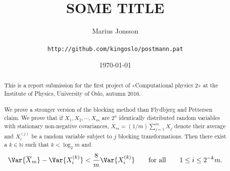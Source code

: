 \documentclass[11pt,english,a4paper]{article}
\author{\normalsize Marius Jonsson \\\\
\vspace{5px}
\normalsize \texttt{http://github.com/kingoslo/postmann.pat}}
\title{\bf \uppercase{Some title}}
\date{\normalsize \today}
\begin{document}
\maketitle
\begin{abstract} \normalsize This is a report submission for the first project of «Computational physics 2» at the Institute of Physics, University of Oslo, autumn 2016.\\
\\
We prove a stronger version of the blocking method than Flydbjerg and Pettersen claim. We prove that if $X_1,X_2,\cdots, X_m$ are $2^n$ identically distributed random variables with stationary non-negative covariances, $\overline X_m = (1/m)\sum_{j=1}^m X_j$ denote their average and $X^{(j)}_i$ be a random variable subject to $j$ blocking transformations. Then there exist a $k \in \mathbb{N}$ such that $k < \log_2 m$ and
\[
\Var{\overline X_m} - \Var{X^{(k)}_i} < \frac{8}{m}\Var{X^{(k)}_i} \qquad \text{for all} \qquad 1 \leq i \leq 2^{-k}m.
\]
\end{abstract}
\lstset{
  xleftmargin=.2\textwidth, xrightmargin=.2\textwidth
}
\end{document}
